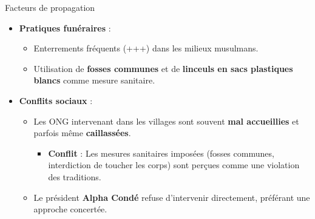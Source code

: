 \documentclass[
  ignorenonframetext,
]{beamer}
\providecommand{\tightlist}{%
  \setlength{\itemsep}{0pt}\setlength{\parskip}{0pt}}\usepackage{longtable,booktabs,array}
\begin{document}
\begin{frame}
\begin{block}{Facteurs de propagation}
\protect\hypertarget{facteurs-de-propagation}{}
\begin{itemize}
\tightlist
\item
  \textbf{Pratiques funéraires} :

  \begin{itemize}
  \tightlist
  \item
    Enterrements fréquents (+++) dans les milieux musulmans.
  \item
    Utilisation de \textbf{fosses communes} et de \textbf{linceuls en
    sacs plastiques blancs} comme mesure sanitaire.
  \end{itemize}
\item
  \textbf{Conflits sociaux} :

  \begin{itemize}
  \tightlist
  \item
    Les ONG intervenant dans les villages sont souvent \textbf{mal
    accueillies} et parfois même \textbf{caillassées}.

    \begin{itemize}
    \tightlist
    \item
      \textbf{Conflit} : Les mesures sanitaires imposées (fosses
      communes, interdiction de toucher les corps) sont perçues comme
      une violation des traditions.
    \end{itemize}
  \item
    Le président \textbf{Alpha Condé} refuse d'intervenir directement,
    préférant une approche concertée.
  \end{itemize}
\end{itemize}
\end{block}
\end{frame}
\end{document}
